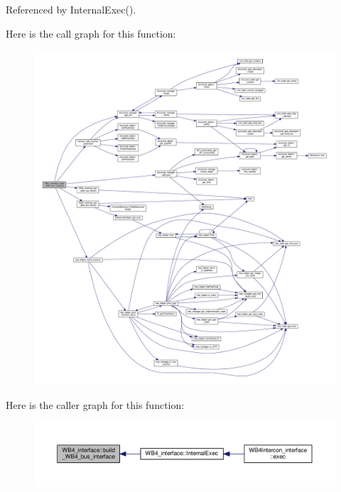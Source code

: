 Referenced by Internal\+Exec().

Here is the call graph for this function\+:
\nopagebreak
\begin{figure}[H]
\begin{center}
\leavevmode
\includegraphics[width=350pt]{d5/d7a/classWB4__interface_ae930f536116f54c76c9d948021a79ab9_cgraph}
\end{center}
\end{figure}
Here is the caller graph for this function\+:
\nopagebreak
\begin{figure}[H]
\begin{center}
\leavevmode
\includegraphics[width=350pt]{d5/d7a/classWB4__interface_ae930f536116f54c76c9d948021a79ab9_icgraph}
\end{center}
\end{figure}
\mbox{\label{classWB4__interface_abd624e3f9aa8be81278be30e7099f88b}} 
